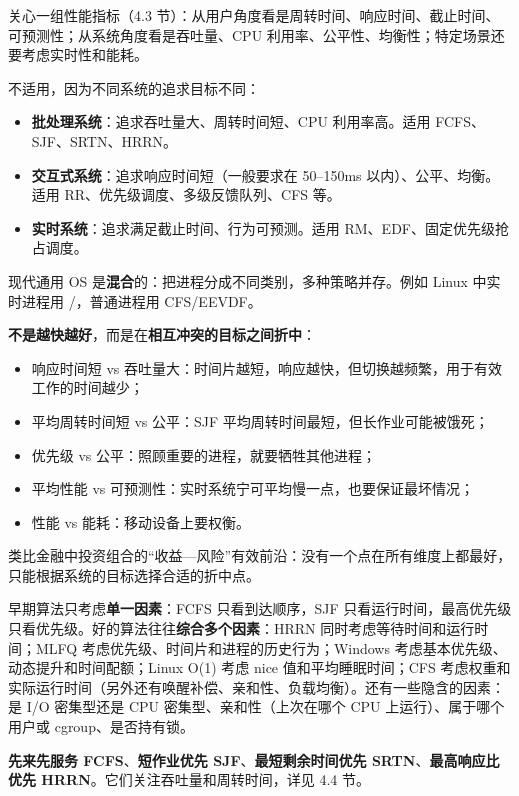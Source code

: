 关心一组性能指标（4.3 节）：从用户角度看是周转时间、响应时间、截止时间、可预测性；从系统角度看是吞吐量、CPU 利用率、公平性、均衡性；特定场景还要考虑实时性和能耗。

不适用，因为不同系统的追求目标不同：
\begin{itemize}
    \item \textbf{批处理系统}：追求吞吐量大、周转时间短、CPU 利用率高。适用 FCFS、SJF、SRTN、HRRN。
    \item \textbf{交互式系统}：追求响应时间短（一般要求在 50–150ms 以内）、公平、均衡。适用 RR、优先级调度、多级反馈队列、CFS 等。
    \item \textbf{实时系统}：追求满足截止时间、行为可预测。适用 RM、EDF、固定优先级抢占调度。
\end{itemize}
现代通用 OS 是\textbf{混合}的：把进程分成不同类别，多种策略并存。例如 Linux 中实时进程用 /，普通进程用 CFS/EEVDF。

\textbf{不是越快越好}，而是在\textbf{相互冲突的目标之间折中}：
\begin{itemize}
    \item 响应时间短 vs 吞吐量大：时间片越短，响应越快，但切换越频繁，用于有效工作的时间越少；
    \item 平均周转时间短 vs 公平：SJF 平均周转时间最短，但长作业可能被饿死；
    \item 优先级 vs 公平：照顾重要的进程，就要牺牲其他进程；
    \item 平均性能 vs 可预测性：实时系统宁可平均慢一点，也要保证最坏情况；
    \item 性能 vs 能耗：移动设备上要权衡。
\end{itemize}
类比金融中投资组合的“收益—风险”有效前沿：没有一个点在所有维度上都最好，只能根据系统的目标选择合适的折中点。

早期算法只考虑\textbf{单一因素}：FCFS 只看到达顺序，SJF 只看运行时间，最高优先级只看优先级。好的算法往往\textbf{综合多个因素}：HRRN 同时考虑等待时间和运行时间；MLFQ 考虑优先级、时间片和进程的历史行为；Windows 考虑基本优先级、动态提升和时间配额；Linux O(1) 考虑 nice 值和平均睡眠时间；CFS 考虑权重和实际运行时间（另外还有唤醒补偿、亲和性、负载均衡）。还有一些隐含的因素：是 I/O 密集型还是 CPU 密集型、亲和性（上次在哪个 CPU 上运行）、属于哪个用户或 cgroup、是否持有锁。

\textbf{先来先服务 FCFS}、\textbf{短作业优先 SJF}、\textbf{最短剩余时间优先 SRTN}、\textbf{最高响应比优先 HRRN}。它们关注吞吐量和周转时间，详见 4.4 节。

